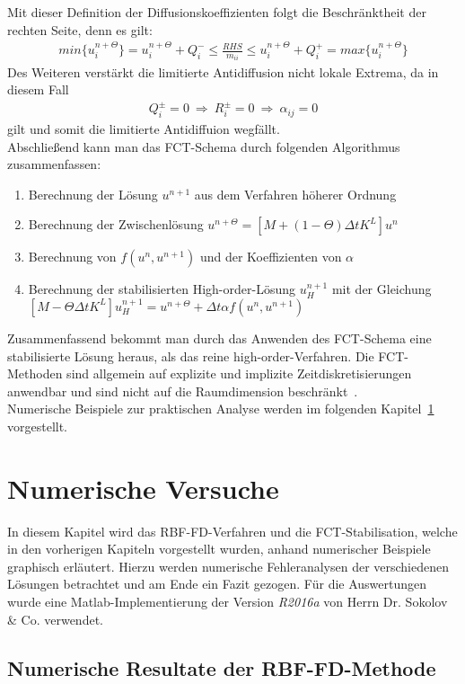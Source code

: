 \documentclass[12pt,titlepage]{article}
\begin{document}
Mit dieser Definition der Diffusionskoeffizienten folgt die Beschränktheit der rechten Seite, denn es gilt:
\begin{align}
 min\{u_i^{n+\Theta}\}=u_i^{n+\Theta}+Q_i^-\le\frac{RHS}{m_{ii}}\le u_i^{n+\Theta}+Q_i^+=max\{u_i^{n+\Theta}\}
\end{align}
Des Weiteren verstärkt die limitierte Antidiffusion nicht lokale Extrema, da in diesem Fall
\begin{align}
 Q_i^\pm=0~\Rightarrow~ R_i^\pm=0~\Rightarrow~\alpha_{ij}=0
\end{align}
gilt und somit die limitierte Antidiffuion wegfällt.\\
Abschließend kann man das FCT-Schema durch folgenden Algorithmus zusammenfassen:
\begin{enumerate}
 \item Berechnung der Lösung $u^{n+1}$ aus dem Verfahren höherer Ordnung
 \item Berechnung der Zwischenlösung $u^{n+\Theta}=[M+(1-\Theta)\Delta tK^L]u^n$
 \item Berechnung von $f(u^n,u^{n+1})$ und der Koeffizienten von $\alpha$
 \item Berechnung der stabilisierten High-order-Lösung $u_H^{n+1}$ mit der Gleichung $[M-\Theta\Delta tK^L]u_H^{n+1}=u^{n+\Theta}+\Delta t\alpha f(u^n,u^{n+1})$
\end{enumerate}
Zusammenfassend bekommt man durch das Anwenden des FCT-Schema eine stabilisierte Lösung heraus, als das reine high-order-Verfahren. Die FCT-Methoden sind allgemein auf explizite und implizite Zeitdiskretisierungen anwendbar und sind nicht auf die Raumdimension beschränkt~\cite{kuzmin2002flux}.\\ Numerische Beispiele zur praktischen Analyse werden im folgenden Kapitel~\ref{sec:NumVers} vorgestellt. 
\pagebreak
\section{Numerische Versuche}\label{sec:NumVers}
In diesem Kapitel wird das RBF-FD-Verfahren und die FCT-Stabilisation, welche in den vorherigen Kapiteln vorgestellt wurden, anhand numerischer Beispiele graphisch erläutert. Hierzu werden numerische Fehleranalysen der verschiedenen Lösungen betrachtet und am Ende ein Fazit gezogen. Für die Auswertungen wurde eine Matlab-Implementierung der Version \textit{R2016a} von Herrn Dr. Sokolov \& Co. verwendet.
\subsection{Numerische Resultate der RBF-FD-Methode}
\end{document}
